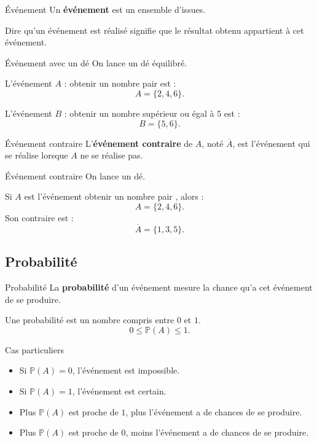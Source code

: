 \documentclass[11pt,a4paper]{article}
\newcommand{\Prob}{\mathbb{P}}
\begin{document}
\begin{definitionbox}{Événement}
Un \textbf{événement} est un ensemble d'issues.

Dire qu'un événement est réalisé signifie que le résultat obtenu appartient à cet événement.
\end{definitionbox}

\begin{examplebox}{Événement avec un dé}
On lance un dé équilibré.

L'événement $A$ : \og obtenir un nombre pair \fg{} est :
\[
A=\{2,4,6\}.
\]

L'événement $B$ : \og obtenir un nombre supérieur ou égal à $5$ \fg{} est :
\[
B=\{5,6\}.
\]
\end{examplebox}

\begin{definitionbox}{Événement contraire}
L'\textbf{événement contraire} de $A$, noté $\overline{A}$, est l'événement qui se réalise lorsque $A$ ne se réalise pas.
\end{definitionbox}

\begin{examplebox}{Événement contraire}
On lance un dé.

Si $A$ est l'événement \og obtenir un nombre pair \fg, alors :
\[
A=\{2,4,6\}.
\]
Son contraire est :
\[
\overline{A}=\{1,3,5\}.
\]
\end{examplebox}

\subsection{Probabilité}

\begin{definitionbox}{Probabilité}
La \textbf{probabilité} d'un événement mesure la chance qu'a cet événement de se produire.

Une probabilité est un nombre compris entre $0$ et $1$.
\[
0\leq \Prob(A)\leq 1.
\]
\end{definitionbox}

\begin{retenirbox}{Cas particuliers}
\begin{itemize}
    \item Si $\Prob(A)=0$, l'événement est impossible.
    \item Si $\Prob(A)=1$, l'événement est certain.
    \item Plus $\Prob(A)$ est proche de $1$, plus l'événement a de chances de se produire.
    \item Plus $\Prob(A)$ est proche de $0$, moins l'événement a de chances de se produire.
\end{itemize}
\end{retenirbox}
\end{document}
